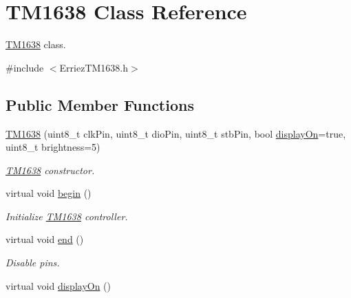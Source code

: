 \hypertarget{class_t_m1638}{}\section{T\+M1638 Class Reference}
\label{class_t_m1638}


\hyperlink{class_t_m1638}{T\+M1638} class.  




{\ttfamily \#include $<$Erriez\+T\+M1638.\+h$>$}

\subsection*{Public Member Functions}
\begin{DoxyCompactItemize}
\item 
\hyperlink{class_t_m1638_af4c0f8d4f26e8cbe64bd9f46a8027127}{T\+M1638} (uint8\+\_\+t clk\+Pin, uint8\+\_\+t dio\+Pin, uint8\+\_\+t stb\+Pin, bool \hyperlink{class_t_m1638_a195aafa49dd926f283751d7ed16033aa}{display\+On}=true, uint8\+\_\+t brightness=5)
\begin{DoxyCompactList}\small\item\em \hyperlink{class_t_m1638}{T\+M1638} constructor. \end{DoxyCompactList}\item 
virtual void \hyperlink{class_t_m1638_a74b4db03225a215928946b2e6f5228dc}{begin} ()\hypertarget{class_t_m1638_a74b4db03225a215928946b2e6f5228dc}{}\label{class_t_m1638_a74b4db03225a215928946b2e6f5228dc}

\begin{DoxyCompactList}\small\item\em Initialize \hyperlink{class_t_m1638}{T\+M1638} controller. \end{DoxyCompactList}\item 
virtual void \hyperlink{class_t_m1638_a73fe114adcfbab4b786641d80b9c6d53}{end} ()\hypertarget{class_t_m1638_a73fe114adcfbab4b786641d80b9c6d53}{}\label{class_t_m1638_a73fe114adcfbab4b786641d80b9c6d53}

\begin{DoxyCompactList}\small\item\em Disable pins. \end{DoxyCompactList}\item 
virtual void \hyperlink{class_t_m1638_a195aafa49dd926f283751d7ed16033aa}{display\+On} ()\hypertarget{class_t_m1638_a195aafa49dd926f283751d7ed16033aa}{}\label{class_t_m1638_a195aafa49dd926f283751d7ed16033aa}


\end{DoxyCompactItemize}
